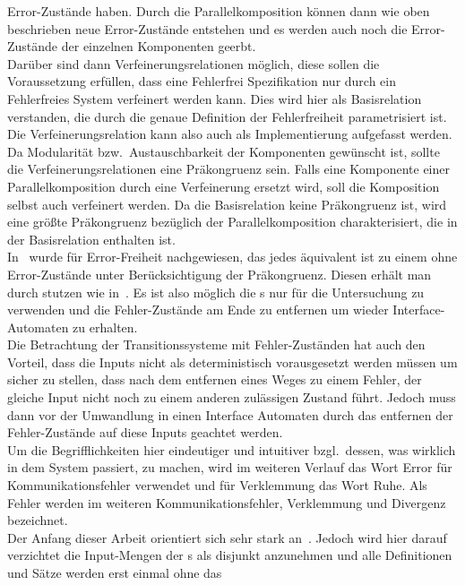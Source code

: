 Error-Zustände haben. Durch die Parallelkomposition können dann wie oben
beschrieben neue Error-Zustände entstehen und es werden auch noch die
Error-Zustände der einzelnen Komponenten geerbt.\\
Darüber sind dann Verfeinerungsrelationen möglich, diese sollen die
Voraussetzung erfüllen, dass eine Fehlerfrei Spezifikation nur durch ein
Fehlerfreies System verfeinert werden kann. Dies wird hier als Basisrelation
verstanden, die durch die genaue Definition der Fehlerfreiheit parametrisiert
ist. Die Verfeinerungsrelation kann also auch als Implementierung aufgefasst
werden.\\
Da Modularität bzw.\ Austauschbarkeit der Komponenten gewünscht ist, sollte die
Verfeinerungsrelationen eine Präkongruenz sein. Falls eine Komponente einer
Parallelkomposition durch eine Verfeinerung ersetzt wird, soll die Komposition
selbst auch verfeinert werden. Da die Basisrelation keine Präkongruenz ist,
wird eine größte Präkongruenz bezüglich der Parallelkomposition
charakterisiert, die in der Basisrelation enthalten ist.\\
In~\cite{Vogler2014EIO} wurde für Error-Freiheit nachgewiesen, das jedes \EIO{}
äquivalent ist zu einem ohne Error-Zustände unter Berücksichtigung der
Präkongruenz. Diesen erhält man durch stutzen wie in~\cite{Alfaro2004}. Es ist
also möglich die \EIO{}s nur für die Untersuchung zu verwenden und die
Fehler-Zustände am Ende zu entfernen um wieder Interface-Automaten zu
erhalten.\\
Die Betrachtung der Transitionssysteme mit Fehler-Zuständen hat auch den
Vorteil, dass die Inputs nicht als deterministisch vorausgesetzt werden müssen
um sicher zu stellen, dass nach dem entfernen eines Weges zu einem Fehler, der
gleiche Input nicht noch zu einem anderen zulässigen Zustand führt. Jedoch muss
dann vor der Umwandlung in einen Interface Automaten durch das entfernen der
Fehler-Zustände auf diese Inputs geachtet werden.\\
Um die Begrifflichkeiten hier eindeutiger und intuitiver bzgl.\ dessen, was
wirklich in dem System passiert, zu machen, wird im weiteren Verlauf
das Wort Error für Kommunikationsfehler verwendet und für Verklemmung das Wort
Ruhe. Als Fehler werden im weiteren Kommunikationsfehler, Verklemmung und
Divergenz bezeichnet.\\
Der Anfang dieser Arbeit orientiert sich sehr stark an~\cite{Vogler2014EIO}.
Jedoch wird hier darauf verzichtet die Input-Mengen der \EIO{}s als disjunkt
anzunehmen und alle Definitionen und Sätze werden erst einmal ohne das
